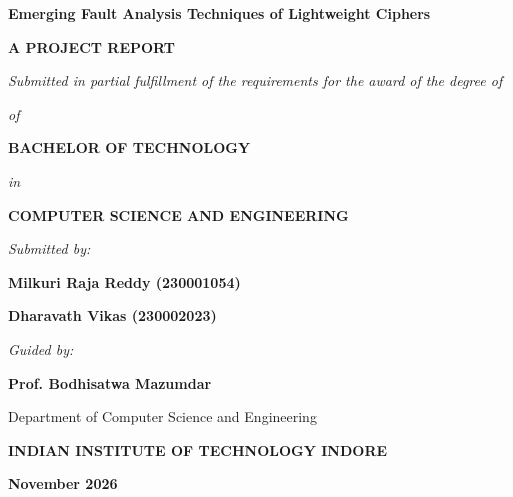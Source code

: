\documentclass[12pt,a4paper,oneside]{report}
\begin{document}
\begin{titlepage}
\centering
\vspace*{0.5cm}
{\huge \textbf{Emerging Fault Analysis Techniques of Lightweight Ciphers}\par}
\vspace{1.5cm}
{\Large \textbf{A PROJECT REPORT}\par}
\vspace{0.5cm}
{\large \textit{Submitted in partial fulfillment of the requirements for the award of the degree of}\par}
\vspace{0.3cm}
{\large \textit{of}\par}
\vspace{0.3cm}
{\Large \textbf{BACHELOR OF TECHNOLOGY}\par}
\vspace{0.3cm}
{\large \textit{in}\par}
\vspace{0.3cm}
{\Large \textbf{COMPUTER SCIENCE AND ENGINEERING}\par}
\vspace{1.5cm}
{\large \textit{Submitted by:}\par}
\vspace{0.3cm}
{\Large \textbf{Milkuri Raja Reddy (230001054)}\par}
\vspace{0.2cm}
{\Large \textbf{Dharavath Vikas (230002023)}\par}
\vspace{1.5cm}
{\large \textit{Guided by:}\par}
\vspace{0.3cm}
{\Large \textbf{Prof. Bodhisatwa Mazumdar}\par}
\vspace{0.2cm}
{\large Department of Computer Science and Engineering\par}
\vfill
{\Large \textbf{INDIAN INSTITUTE OF TECHNOLOGY INDORE}\par}
\vspace{0.3cm}
{\Large \textbf{November 2026}\par}
\vspace*{0.5cm}
\end{titlepage}

\cleardoublepage
{}
\setcounter{page}{4}
\end{document}
